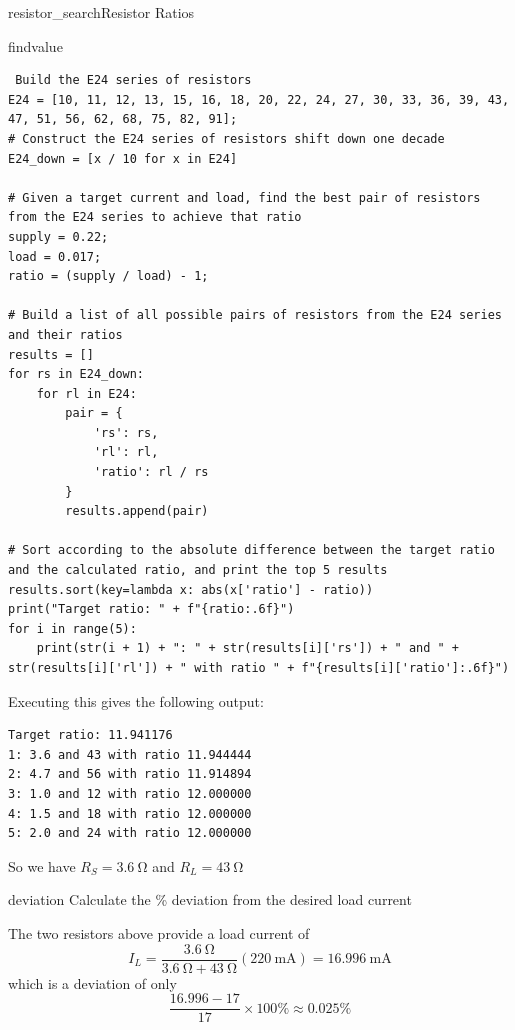 \begin{mainquestion}{resistor_search}{Resistor Ratios}
\begin{partquestion}{findvalue}
\begin{answer}
\clearpage
\begin{lstlisting}
 Build the E24 series of resistors
E24 = [10, 11, 12, 13, 15, 16, 18, 20, 22, 24, 27, 30, 33, 36, 39, 43, 47, 51, 56, 62, 68, 75, 82, 91];
# Construct the E24 series of resistors shift down one decade
E24_down = [x / 10 for x in E24]

# Given a target current and load, find the best pair of resistors from the E24 series to achieve that ratio
supply = 0.22;
load = 0.017;
ratio = (supply / load) - 1;

# Build a list of all possible pairs of resistors from the E24 series and their ratios
results = []
for rs in E24_down:
    for rl in E24:
        pair = {
            'rs': rs,
            'rl': rl,
            'ratio': rl / rs
        }
        results.append(pair)

# Sort according to the absolute difference between the target ratio and the calculated ratio, and print the top 5 results
results.sort(key=lambda x: abs(x['ratio'] - ratio))
print("Target ratio: " + f"{ratio:.6f}")
for i in range(5):
    print(str(i + 1) + ": " + str(results[i]['rs']) + " and " + str(results[i]['rl']) + " with ratio " + f"{results[i]['ratio']:.6f}")
\end{lstlisting}

Executing this gives the following output:

\begin{lstlisting}
Target ratio: 11.941176
1: 3.6 and 43 with ratio 11.944444
2: 4.7 and 56 with ratio 11.914894
3: 1.0 and 12 with ratio 12.000000
4: 1.5 and 18 with ratio 12.000000
5: 2.0 and 24 with ratio 12.000000
\end{lstlisting}
So we have $R_S = \qty{3.6}{\ohm}$ and $R_L = \qty{43}{\ohm}$
\end{answer}
\end{partquestion}

\begin{partquestion}{deviation}
{Calculate the \% deviation from the desired load current}

\begin{answer}
The two resistors above provide a load current of
\[I_L=\frac{\qty{3.6}{\ohm}}{\qty{3.6}{\ohm} + \qty{43}{\ohm}}(\qty{220}{\milli\ampere}) = \qty{16.996}{\milli\ampere}\]
which is a deviation of only
\[\frac{16.996-17}{17}\times100\% \approx0.025\%\]
\end{answer}
\end{partquestion}


\end{mainquestion}
